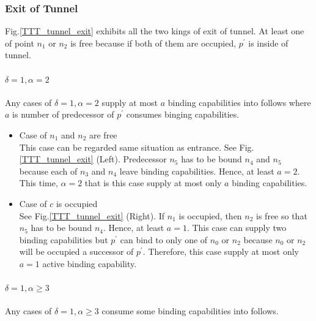 \documentclass[runningheads]{llncs}
\begin{document}
\subsubsection{Exit of Tunnel}


Fig.\ref{TTT_tunnel_exit} exhibits all the two kings of exit of tunnel. 
At least one of point $n_1$ or $n_2$ is free because if both of them are occupied, $p^\prime$ is inside of tunnel.

\paragraph{$\delta = 1, \alpha = 2$}
 Any cases of $\delta = 1, \alpha = 2$ supply at most $a$ binding capabilities into follows where $a$ is number of predecessor of $p^\prime$ consumes binging capabilities.

\begin{itemize}
\item{Case of $n_1$ and $n_2$ are free}\\
  This case can be regarded same situation as entrance. See Fig.\ref{TTT_tunnel_exit} (Left). Predecessor $n_5$ has to be bound $n_4$ and $n_5$ because each of $n_3$ and $n_4$ leave binding capabilities. Hence, at least $a=2$. This time, $\alpha = 2$ that is this case supply at most only $a$ binding capabilities.
  
\item{Case of $c$ is occupied}\\
  See Fig.\ref{TTT_tunnel_exit} (Right). If $n_1$ is occupied, then $n_2$ is free so that $n_5$ has to be bound $n_4$. Hence, at least $a=1$. This case can supply two binding capabilities but $p^\prime$ can bind to only one of $n_0$ or $n_2$ because $n_0$ or $n_2$ will be occupied a successor of $p^\prime$. Therefore, this case supply at most only $a=1$ active binding capability.
  
\end{itemize}

\paragraph{$\delta = 1, \alpha \geq 3$}
Any cases of $\delta = 1, \alpha \geq 3$ consume some binding capabilities into follows.
\end{document}
